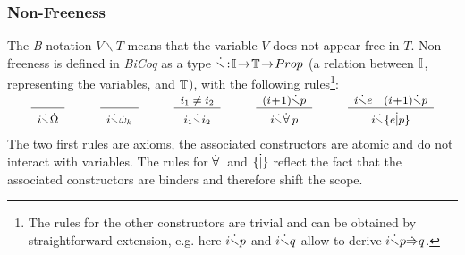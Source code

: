 \documentclass{llncs}
\begin{document}
\subsubsection{Non-Freeness} The \emph{B} notation $V \backslash T$ means that the variable 
$V$ does not appear free in $T$. Non-freeness is defined in \emph{BiCoq} as a type 
$\dot{\smallsetminus}\!:\!\mathbb{I}\!\to\!\mathbb{T}\!\to\!Prop$ (a relation between $\mathbb{I}$, representing the 
variables, and $\mathbb{T}$), with the following rules\footnote{The rules for the other 
constructors are trivial and can be obtained by straightforward extension, e.g. here
$i \dot{\smallsetminus} p$ and $i \dot{\smallsetminus} q$ allow to derive $i \dot{\smallsetminus} p\dot{\Rightarrow} q$.}:
\[
\small
\begin{array}{ccccc}
\vspace{-16pt} \\
\begin{array}{c} \\\hline \rule{0cm}{12pt} i \Bnotfree \ebig \end{array}
\quad&\quad
\begin{array}{c} \\\hline \rule{0cm}{12pt}  i \Bnotfree \ebie{k}\end{array}
\quad&\quad
\begin{array}{c} i_1 \neq i_2 \\\hline \rule{0cm}{12pt}  i_1 \Bnotfree i_2\end{array} 
\quad&\quad
\begin{array}{c} (i\!+\!1)\Bnotfree p\\\hline \rule{0cm}{12pt} i\Bnotfree\pfor p \end{array}
\quad&\quad
\begin{array}{c} i \Bnotfree e \quad (i\!+\!1) \Bnotfree p\\\hline \rule{0cm}{12pt}
                 i \Bnotfree \ecmp{e}{p} \end{array}\\
\end{array}
\]
The two first rules are axioms, the associated constructors are atomic and do not interact 
with variables. The rules for $\dot{\forall}\:$ and $\{ {}\dot{|}{} \} $ reflect the fact that the associated 
constructors are binders and therefore shift the scope.
\end{document}
